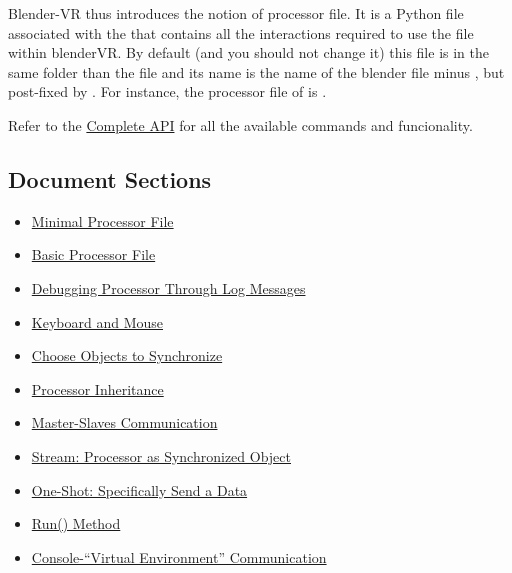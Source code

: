 \documentclass[a4,10pt,openany,oneside]{sphinxmanual}
\begin{document}
Blender-VR thus introduces the notion of processor file. It is a Python file associated with the  that contains all the interactions required to use the  file within blenderVR.
By default (and you should not change it) this file is in the same folder than the  file and its name is the name of the blender file minus , but post-fixed by . For instance, the processor file of  is .

Refer to the \href{http://blender-vr.readthedocs.org}{Complete API} for all the available commands and funcionality.


\subsection{Document Sections}
\label{components/processor-file:document-sections}\begin{itemize}
\item {} 
{\hyperref[components/processor-file:minimal-processor-file]{Minimal Processor File}}

\item {} 
{\hyperref[components/processor-file:basic-processor-file]{Basic Processor File}}

\item {} 
{\hyperref[components/processor-file:debugging-processor-through-log-messages]{Debugging Processor Through Log Messages}}

\item {} 
{\hyperref[components/processor-file:keyboard-and-mouse]{Keyboard and Mouse}}

\item {} 
{\hyperref[components/processor-file:choose-objects-to-synchronize]{Choose Objects to Synchronize}}

\item {} 
{\hyperref[components/processor-file:processor-inheritance]{Processor Inheritance}}

\item {} 
{\hyperref[components/processor-file:master-slaves-communication]{Master-Slaves Communication}}

\item {} 
{\hyperref[components/processor-file:stream-processor-as-synchronized-object]{Stream: Processor as Synchronized Object}}

\item {} 
{\hyperref[components/processor-file:one-shot-specifically-send-a-data]{One-Shot: Specifically Send a Data}}

\item {} 
{\hyperref[components/processor-file:run-method]{Run() Method}}

\item {} 
{\hyperref[components/processor-file:console-virtual-environment-communication]{Console-``Virtual Environment'' Communication}}

\end{itemize}
\end{document}
